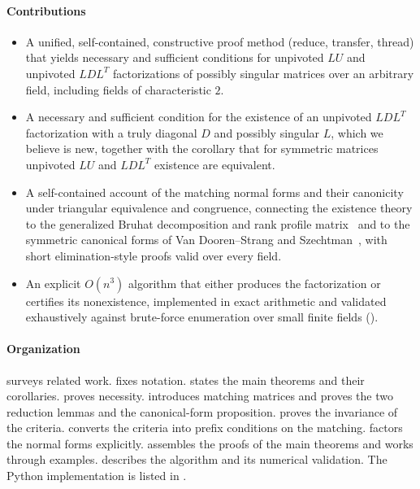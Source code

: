 \paragraph{Contributions}
\begin{itemize}
  \item A unified, self-contained, constructive proof method (reduce,
    transfer, thread) that yields necessary and sufficient conditions for
    unpivoted $LU$ and unpivoted $LDL^T$ factorizations of possibly singular
    matrices over an arbitrary field, including fields of characteristic
    $2$.
  \item A necessary and sufficient condition for the existence of an
    unpivoted $LDL^T$ factorization with a truly diagonal $D$ and possibly
    singular $L$, which we believe is new, together with the corollary that
    for symmetric matrices unpivoted $LU$ and $LDL^T$ existence are
    equivalent.
  \item A self-contained account of the matching normal forms and their
    canonicity under triangular equivalence and congruence, connecting the
    existence theory to the generalized Bruhat decomposition and rank
    profile matrix~\cite{elsner_bruhat_1979,malaschonok_2010,dumas_pernet_sultan_2017}
    and to the symmetric canonical forms of Van Dooren--Strang and
    Szechtman~\cite{vandooren_strang_2014,szechtman_2007}, with short
    elimination-style proofs valid over every field.
  \item An explicit $O(n^3)$ algorithm that either produces the
    factorization or certifies its nonexistence, implemented in exact
    arithmetic and validated exhaustively against brute-force enumeration
    over small finite fields ().
\end{itemize}

\paragraph{Organization}
 surveys related work.   fixes notation.
 states the main theorems and their corollaries.
 proves necessity.   introduces
matching matrices and proves the two reduction lemmas and the canonical-form
proposition.   proves the invariance of the criteria.
 converts the criteria into prefix conditions on the
matching.   factors the normal forms explicitly.
 assembles the proofs of the main theorems and works
through examples.   describes the algorithm and its
numerical validation.  The Python implementation is listed in
.
